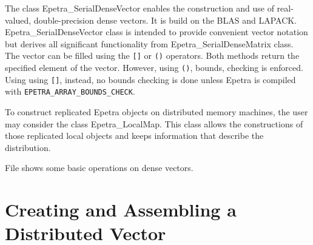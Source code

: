 The class Epetra\_SerialDenseVector enables the construction and use of
real-valued, double-precision dense vectors. It is build on the BLAS and
LAPACK. Epetra\_SerialDenseVector class is intended to provide
convenient vector notation but derives all significant functionality
from Epetra\_SerialDenseMatrix class.  The vector can be filled using
the \verb![]! or \verb!()! operators.  Both methods return the specified
element of the vector.  However, using \verb!()!, bounds, checking is
enforced. Using using \verb![]!, instead, no bounds checking is done
unless Epetra is compiled with \verb!EPETRA_ARRAY_BOUNDS_CHECK!.

\begin{remark}
  To construct replicated Epetra objects on distributed memory machines,
  the user may consider the class Epetra\_LocalMap. This class allows
  the constructions of those replicated local objects and keeps
  information that describe the distribution.
\end{remark}

File  shows some basic operations on dense vectors.


\section{Creating and Assembling a Distributed Vector}
\label{sec:distr_vec}


